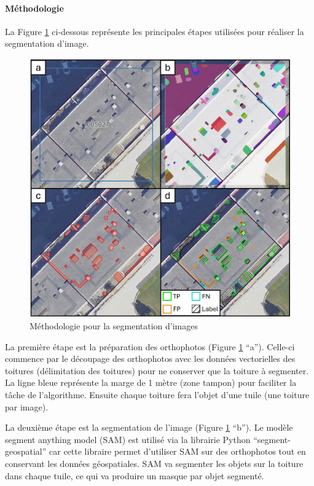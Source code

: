 \paragraph{Méthodologie}
La Figure \ref{fig:stdl_08_methodo_segmentation_images} ci-dessous représente les principales étapes utilisées pour réaliser la segmentation d'image.
\begin{figure}[H]
    \centering
    \includegraphics[width=1\linewidth]{02-main//figures/ch2/stdl_08_methodo_segmentation_images.png}
    \caption{Méthodologie pour la segmentation d’images \cite{herny_detection_2024}}
    \label{fig:stdl_08_methodo_segmentation_images}
\end{figure}

\par{La première étape est la préparation des orthophotos (Figure \ref{fig:stdl_08_methodo_segmentation_images} ``a''). Celle-ci commence par le découpage des orthophotos avec les données vectorielles des toitures (délimitation des toitures) pour ne conserver que la toiture à segmenter. La ligne bleue représente la marge de 1 mètre (zone tampon) pour faciliter la tâche de l'algorithme. Ensuite chaque toiture fera l'objet d'une tuile (une toiture par image).}

\par{La deuxième étape est la segmentation de l'image (Figure \ref{fig:stdl_08_methodo_segmentation_images} ``b''). Le modèle segment anything model (SAM) est utilisé via la librairie Python ``segment-geospatial'' \cite{wu_samgeo_2023} car cette libraire permet d'utiliser SAM sur des orthophotos tout en conservant les données géospatiales. SAM va segmenter les objets sur la toiture dans chaque tuile, ce qui va produire un masque par objet segmenté.}

